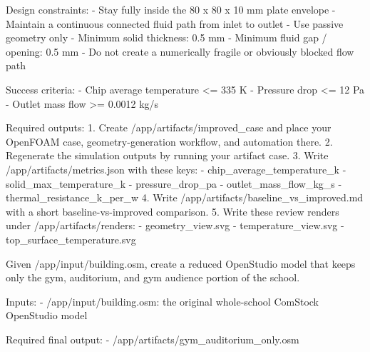 \documentclass{llmxive}
\begin{document}
\begin{instructionbox}
Design constraints:
- Stay fully inside the \textasciigrave{}80 x 80 x 10 mm\textasciigrave{} plate envelope
- Maintain a continuous connected fluid path from inlet to outlet
- Use passive geometry only
- Minimum solid thickness: \textasciigrave{}0.5 mm\textasciigrave{}
- Minimum fluid gap / opening: \textasciigrave{}0.5 mm\textasciigrave{}
- Do not create a numerically fragile or obviously blocked flow path

Success criteria:
- Chip average temperature \textasciigrave{}\textless{}= 335 K\textasciigrave{}
- Pressure drop \textasciigrave{}\textless{}= 12 Pa\textasciigrave{}
- Outlet mass flow \textasciigrave{}\textgreater{}= 0.0012 kg/s\textasciigrave{}

Required outputs:
1. Create \textasciigrave{}/app/artifacts/improved\_case\textasciigrave{} and place your OpenFOAM case, geometry-generation workflow, and automation there.
2. Regenerate the simulation outputs by running your artifact case.
3. Write \textasciigrave{}/app/artifacts/metrics.json\textasciigrave{} with these keys:
   - \textasciigrave{}chip\_average\_temperature\_k\textasciigrave{}
   - \textasciigrave{}solid\_max\_temperature\_k\textasciigrave{}
   - \textasciigrave{}pressure\_drop\_pa\textasciigrave{}
   - \textasciigrave{}outlet\_mass\_flow\_kg\_s\textasciigrave{}
   - \textasciigrave{}thermal\_resistance\_k\_per\_w\textasciigrave{}
4. Write \textasciigrave{}/app/artifacts/baseline\_vs\_improved.md\textasciigrave{} with a short baseline-vs-improved comparison.
5. Write these review renders under \textasciigrave{}/app/artifacts/renders\textasciigrave{}:
   - \textasciigrave{}geometry\_view.svg\textasciigrave{}
   - \textasciigrave{}temperature\_view.svg\textasciigrave{}
   - \textasciigrave{}top\_surface\_temperature.svg\textasciigrave{}
\end{instructionbox}

\begin{instructionbox}
Given \textasciigrave{}/app/input/building.osm\textasciigrave{}, create a reduced OpenStudio model that keeps only the gym, auditorium, and gym audience portion of the school.

Inputs:
- \textasciigrave{}/app/input/building.osm\textasciigrave{}: the original whole-school ComStock OpenStudio model

Required final output:
- \textasciigrave{}/app/artifacts/gym\_auditorium\_only.osm\textasciigrave{}
\end{instructionbox}
\end{document}
